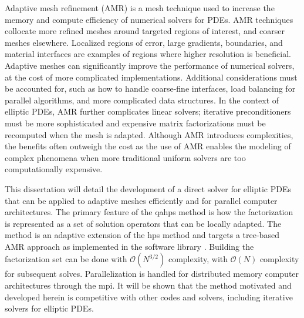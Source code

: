 Adaptive mesh refinement (AMR) is a mesh technique used to increase the memory and compute efficiency of numerical solvers for PDEs. AMR techniques collocate more refined meshes around targeted regions of interest, and coarser meshes elsewhere. Localized regions of error, large gradients, boundaries, and material interfaces are examples of regions where higher resolution is beneficial. Adaptive meshes can significantly improve the performance of numerical solvers, at the cost of more complicated implementations. Additional considerations must be accounted for, such as how to handle coarse-fine interfaces, load balancing for parallel algorithms, and more complicated data structures. In the context of elliptic PDEs, AMR further complicates linear solvers; iterative preconditioners must be more sophisticated and expensive matrix factorizations must be recomputed when the mesh is adapted. Although AMR introduces complexities, the benefits often outweigh the cost as the use of AMR enables the modeling of complex phenomena when more traditional uniform solvers are too computationally expensive.

This dissertation will detail the development of a direct solver for elliptic PDEs that can be applied to adaptive meshes efficiently and for parallel computer architectures. The primary feature of the \gls{qahps} method is how the factorization is represented as a set of solution operators that can be locally adapted. The method is an adaptive extension of the \gls{hps} method \citep{gillman2014direct} and targets a tree-based AMR approach as implemented in the \pforest software library \citep{burstedde2011p4est}. Building the factorization set can be done with $\mathcal{O}(N^{3/2})$ complexity, with $\mathcal{O}(N)$ complexity for subsequent solves. Parallelization is handled for distributed memory computer architectures through the \gls{mpi}. It will be shown that the method motivated and developed herein is competitive with other codes and solvers, including iterative solvers for elliptic PDEs.